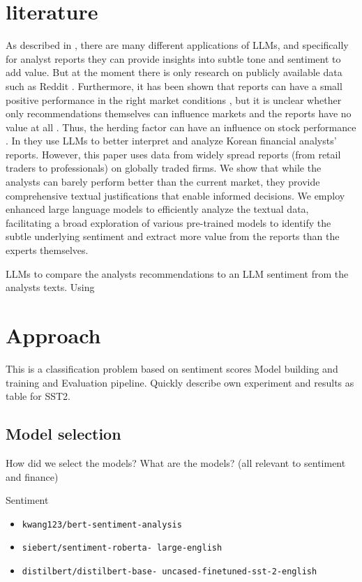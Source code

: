 \documentclass[conference]{IEEEtran}
\begin{document}
\section{literature}%
As described in \cite{Zhao2024}, there are many different applications of LLMs, and specifically for analyst reports they can provide insights into subtle tone and sentiment to add value. But at the moment there is only research on publicly available data such as Reddit \cite{Deng2023}. Furthermore, it has been shown that reports can have a small positive performance in the right market conditions \cite{Su2020}, but it is unclear whether only recommendations themselves can influence markets \cite{Brauer2018} and the reports have no value at all \cite{Panchenko2007}. Thus, the herding factor can have an influence on stock performance \cite{Palmer2018}.
In \cite{Kim2023} they use LLMs to better interpret and analyze Korean financial analysts' reports.
However, this paper uses data from widely spread reports (from retail traders to professionals) on globally traded firms. We show that while the analysts can barely perform better than the current market, they provide comprehensive textual justifications that enable informed decisions. We employ enhanced large language models to efficiently analyze the textual data, facilitating a broad exploration of various pre-trained models to identify the subtle underlying sentiment and extract more value from the reports than the experts themselves.

 LLMs to compare the analysts recommendations to an LLM sentiment from the analysts texts. Using 
\section{Approach}%
This is a classification problem based on sentiment scores
Model building and training and Evaluation pipeline.
Quickly describe own experiment and results as table for SST2.

\subsection{Model selection}%
How did we select the models? What are the models?
(all relevant to sentiment and finance)

Sentiment
\begin{itemize}
\item \texttt{kwang123/bert-sentiment-analysis}
\item \texttt{siebert/sentiment-roberta- large-english}
\item \texttt{distilbert/distilbert-base- uncased-finetuned-sst-2-english}
\end{itemize}
\end{document}
